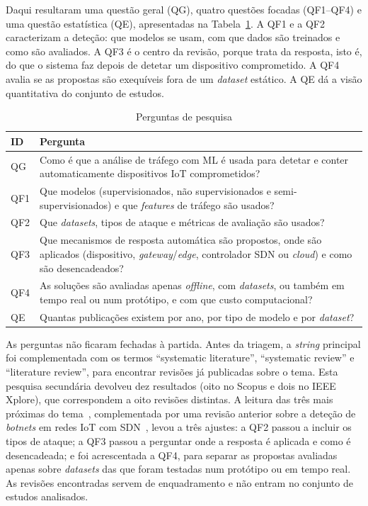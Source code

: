 \documentclass[conference,a4paper]{IEEEtran}
\begin{document}
Daqui resultaram uma questão geral (QG), quatro questões focadas (QF1--QF4) e uma
questão estatística (QE), apresentadas na Tabela~\ref{tab:perguntas}. A QF1 e a QF2
caracterizam a deteção: que modelos se usam, com que dados são treinados e como são
avaliados. A QF3 é o centro da revisão, porque trata da resposta, isto é, do que o
sistema faz depois de detetar um dispositivo comprometido. A QF4 avalia se as propostas
são exequíveis fora de um \textit{dataset} estático. A QE dá a visão quantitativa do
conjunto de estudos.

\begin{table}[H]
\caption{Perguntas de pesquisa}\label{tab:perguntas}
\centering\footnotesize
\begin{tabular}{@{}p{}p{}@{}}
\toprule
ID & Pergunta \\
\midrule
QG  & Como é que a análise de tráfego com ML é usada para detetar e conter automaticamente dispositivos IoT comprometidos? \\
QF1 & Que modelos (supervisionados, não supervisionados e semi-supervisionados) e que \textit{features} de tráfego são usados? \\
QF2 & Que \textit{datasets}, tipos de ataque e métricas de avaliação são usados? \\
QF3 & Que mecanismos de resposta automática são propostos, onde são aplicados (dispositivo, \textit{gateway}/\textit{edge}, controlador SDN ou \textit{cloud}) e como são desencadeados? \\
QF4 & As soluções são avaliadas apenas \textit{offline}, com \textit{datasets}, ou também em tempo real ou num protótipo, e com que custo computacional? \\
QE  & Quantas publicações existem por ano, por tipo de modelo e por \textit{dataset}? \\
\bottomrule
\end{tabular}
\end{table}

As perguntas não ficaram fechadas à partida. Antes da triagem, a \textit{string} principal
foi complementada com os termos ``systematic literature'', ``systematic review'' e
``literature review'', para encontrar revisões já publicadas sobre o tema. Esta pesquisa
secundária devolveu dez resultados (oito no Scopus e dois no IEEE Xplore), que
correspondem a oito revisões distintas. A leitura das três mais próximas do
tema~\cite{kandah2025navigating,bhardwaj2025systematic,veramundaca2024cybersecurity},
complementada por uma revisão anterior sobre a deteção de \textit{botnets} em redes IoT
com SDN~\cite{negera2022review}, levou a três ajustes: a QF2 passou a incluir os tipos de ataque; a QF3 passou a perguntar
onde a resposta é aplicada e como é desencadeada; e foi acrescentada a QF4, para separar
as propostas avaliadas apenas sobre \textit{datasets} das que foram testadas num
protótipo ou em tempo real. As revisões encontradas servem de enquadramento e não entram
no conjunto de estudos analisados.
\end{document}
